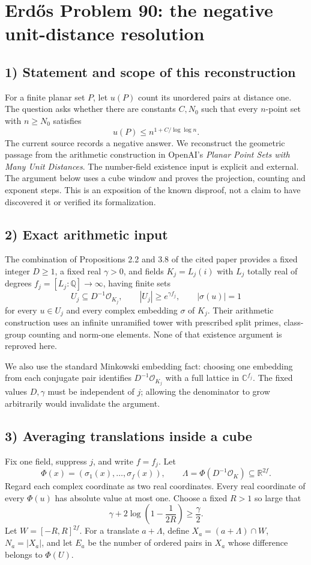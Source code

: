 \section{Erd\H{o}s Problem 90: the negative unit-distance resolution}

\subsection{1) Statement and scope of this reconstruction}
For a finite planar set $P$, let $u(P)$ count its unordered pairs
at distance one. The question asks whether there are constants
$C,N_0$ such that every $n$-point set with $n\geq N_0$ satisfies
\[
 u(P)\leq n^{1+C/\log\log n}.
\]
The current source records a negative answer. We reconstruct the
geometric passage from the arithmetic construction in OpenAI's
\emph{Planar Point Sets with Many Unit Distances}. The number-field
existence input is explicit and external. The argument below uses
a cube window and proves the projection, counting and exponent
steps. This is an exposition of the known disproof, not a claim
to have discovered it or verified its formalization.

\subsection{2) Exact arithmetic input}
The combination of Propositions 2.2 and 3.8 of the cited paper
provides a fixed integer $D\geq1$, a fixed real $\gamma>0$, and
fields $K_j=L_j(i)$ with $L_j$ totally real of degrees
$f_j=[L_j:\mathbb Q]\to\infty$, having finite sets
\[
 U_j\subseteq D^{-1}\mathcal O_{K_j},\qquad |U_j|\geq e^{\gamma f_j},
 \qquad |\sigma(u)|=1
\]
for every $u\in U_j$ and every complex embedding $\sigma$ of
$K_j$. Their arithmetic construction uses an infinite unramified
tower with prescribed split primes, class-group counting and norm-one
elements. None of that existence argument is reproved here.

We also use the standard Minkowski embedding fact: choosing one
embedding from each conjugate pair identifies
$D^{-1}\mathcal O_{K_j}$ with a full lattice in $\mathbb C^{f_j}$.
The fixed values $D,\gamma$ must be independent of $j$; allowing
the denominator to grow arbitrarily would invalidate the argument.

\subsection{3) Averaging translations inside a cube}
Fix one field, suppress $j$, and write $f=f_j$. Let
\[
 \Phi(x)=(\sigma_1(x),\ldots,\sigma_f(x)),\qquad
 \Lambda=\Phi(D^{-1}\mathcal O_K)\subseteq\mathbb R^{2f}.
\]
Regard each complex coordinate as two real coordinates. Every real
coordinate of every $\Phi(u)$ has absolute value at most one.
Choose a fixed $R>1$ so large that
\[
 \gamma+2\log\left(1-\frac1{2R}\right)\geq\frac\gamma2.
\]
Let $W=[-R,R]^{2f}$. For a translate $a+\Lambda$, define
$X_a=(a+\Lambda)\cap W$, $N_a=|X_a|$, and let $E_a$ be the
number of ordered pairs in $X_a$ whose difference belongs to
$\Phi(U)$.

